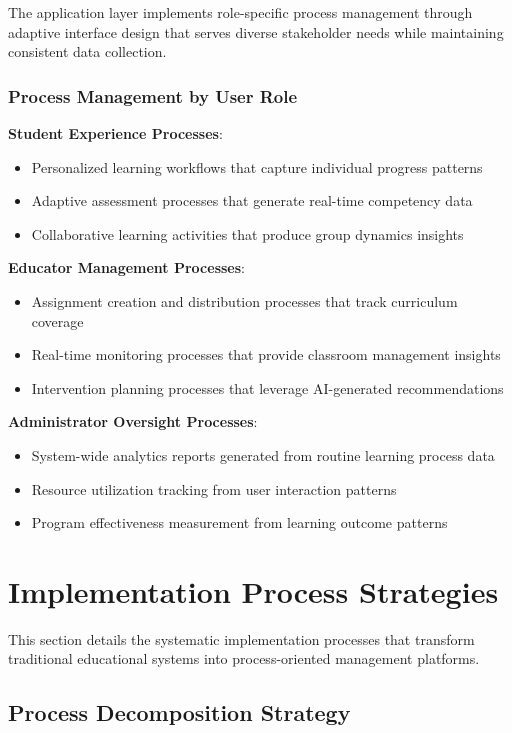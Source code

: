 \documentclass[conference]{IEEEtran}
\begin{document}
The application layer implements role-specific process management through adaptive interface design that serves diverse stakeholder needs while maintaining consistent data collection.

\subsubsection{Process Management by User Role}

\textbf{Student Experience Processes}:
\begin{itemize}
    \item Personalized learning workflows that capture individual progress patterns
    \item Adaptive assessment processes that generate real-time competency data
    \item Collaborative learning activities that produce group dynamics insights
\end{itemize}

\textbf{Educator Management Processes}:
\begin{itemize}
    \item Assignment creation and distribution processes that track curriculum coverage
    \item Real-time monitoring processes that provide classroom management insights
    \item Intervention planning processes that leverage AI-generated recommendations
\end{itemize}

\textbf{Administrator Oversight Processes}:
\begin{itemize}
    \item System-wide analytics reports generated from routine learning process data
    \item Resource utilization tracking from user interaction patterns
    \item Program effectiveness measurement from learning outcome patterns
\end{itemize}

\section{Implementation Process Strategies}

This section details the systematic implementation processes that transform traditional educational systems into process-oriented management platforms.

\subsection{Process Decomposition Strategy}
\end{document}
